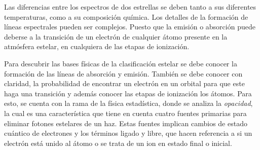 \documentclass[12pt,oneside,openany,letter]{book}
\begin{document}
\noindent Las diferencias entre los espectros de dos estrellas se deben tanto a sus diferentes temperaturas, como a su composición química. Los detalles de la formación de líneas espectrales pueden ser complejos. Puesto que la emisión o absorción puede deberse a la transición de un electrón de cualquier átomo presente en la atmósfera estelar, en cualquiera de las etapas de ionización.


\noindent Para descubrir las bases físicas de la clasificación estelar se debe conocer la formación de las líneas de absorción y emisión. También se debe conocer con claridad, la probabilidad de encontrar un electrón en un orbital para que este haga una transición y además conocer las etapas de ionización los átomos. Para esto, se cuenta con la rama de la física estadística, donde se analiza la \textit{opacidad}, la cual es una característica que tiene en cuenta cuatro fuentes primarias para eliminar fotones estelares de un haz. Estas fuentes implican cambios de estado cuántico de electrones y los términos ligado y libre, que hacen referencia a si un electrón está unido al átomo o se trata de un ion en estado final o inicial.
\end{document}
